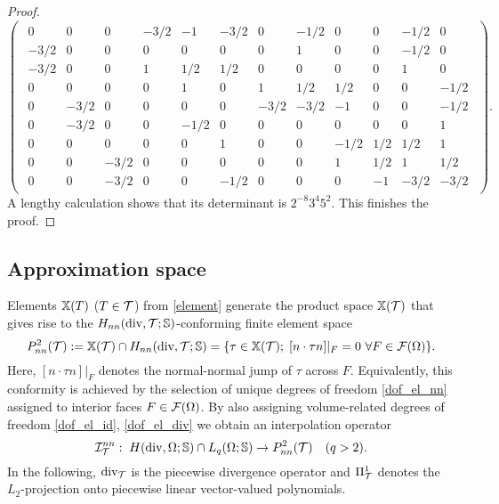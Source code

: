 \documentclass[11pt]{article}
\begin{document}
\begin{proof}
\[\begin{pmatrix}
\begin{array}{ccc|ccc|ccc|ccc}
  0 & 0 & 0    &     -3/2& -1 & -3/2 &      0   & -1/2 & 0     & 0 & -1/2 & 0 \\
  -3/2 & 0& 0  &     0 &  0 & 0      &      0   & 1 & 0        & 0 & -1/2 & 0 \\
  -3/2 & 0& 0  &     1 & 1/2& 1/2    &      0   & 0 & 0        & 0 & 1 & 0    \\\hline

  0 & 0  & 0   &     0 & 1 & 0       &       1  & 1/2 & 1/2    & 0 & 0 & -1/2 \\
  0 & -3/2 & 0 &     0 & 0 & 0       &     -3/2 & -3/2 & -1    & 0 & 0 & -1/2 \\
  0 & -3/2 & 0 &     0 & -1/2 & 0    &       0  & 0 & 0        & 0 & 0 & 1    \\\hline

  0 & 0 & 0    &     0 & 0 & 1       &       0  & 0 & -1/2     & 1/2& 1/2& 1  \\
  0 & 0 & -3/2 &     0 & 0 & 0       &       0  & 0 & 1        & 1/2& 1& 1/2  \\
  0 & 0 & -3/2 &     0 & 0 & -1/2    &       0  & 0 & 0        & -1& -3/2& -3/2
\end{array}
\end{pmatrix}.
\]
A lengthy calculation shows that its determinant is $2^{-8} 3^4 5^2$.
This finishes the proof.
\end{proof}

\subsection{Approximation space} \label{sec_approx}

Elements $\mathbb{X}(T)$ ($T\in\mathcal{T}$) from \eqref{element} generate the product
space $\mathbb{X}(\mathcal{T})$ that gives rise to
the $H_{nn}(\operatorname{div},\mathcal{T};\mathbb{S})$-conforming finite element space
\[
   P^2_{nn}(\mathcal{T}) := \mathbb{X}(\mathcal{T})\cap H_{nn}(\operatorname{div},\mathcal{T};\mathbb{S})
   = \{\tau\in\mathbb{X}(\mathcal{T});\; [n\cdot\tau n]|_F=0\ \forall F\in\mathcal{F}(\Omega)\}.
\]
Here, $[n\cdot\tau n]|_F$ denotes the normal-normal jump of $\tau$ across $F$.
Equivalently, this conformity is achieved by the selection of unique degrees
of freedom \eqref{dof_el_nn} assigned to interior faces $F\in\mathcal{F}(\Omega)$.
By also assigning volume-related degrees of freedom \eqref{dof_el_id}, \eqref{dof_el_div}
we obtain an interpolation operator
\[
   \mathcal{I}^{nn}_{\mathcal{T}}:\; H(\operatorname{div},\Omega;\mathbb{S})\cap L_q(\Omega;\mathbb{S}) \to P^2_{nn}(\mathcal{T})
   \quad (q>2).
\]
%
In the following, $\operatorname{div}_{\mathcal{T}}$ is the piecewise divergence operator and
$\Pi^1_{\mathcal{T}}$ denotes the $L_2$-projection onto piecewise linear vector-valued polynomials.
\end{document}
